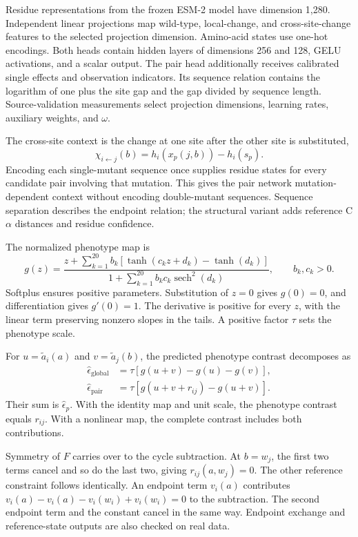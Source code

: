 \documentclass{llncs}
\begin{document}
Residue representations from the frozen ESM-2 model have dimension 1,280. Independent linear projections map wild-type, local-change, and cross-site-change features to the selected projection dimension. Amino-acid states use one-hot encodings. Both heads contain hidden layers of dimensions 256 and 128, GELU activations, and a scalar output. The pair head additionally receives calibrated single effects and observation indicators. Its sequence relation contains the logarithm of one plus the site gap and the gap divided by sequence length. Source-validation measurements select projection dimensions, learning rates, auxiliary weights, and $\omega$.

The cross-site context is the change at one site after the other site is substituted,
\begin{equation}
\chi_{i\leftarrow j}(b)=h_i(x_p(j,b))-h_i(s_p).
\end{equation}
Encoding each single-mutant sequence once supplies residue states for every candidate pair involving that mutation. This gives the pair network mutation-dependent context without encoding double-mutant sequences. Sequence separation describes the endpoint relation; the structural variant adds reference C$\alpha$ distances and residue confidence.

The normalized phenotype map is
\begin{equation}
g(z)=\frac{z+\sum_{k=1}^{20}b_k[\tanh(c_kz+d_k)-\tanh(d_k)]}
{1+\sum_{k=1}^{20}b_kc_k\operatorname{sech}^2(d_k)},\qquad b_k,c_k>0.
\end{equation}
Softplus ensures positive parameters. Substitution of $z=0$ gives $g(0)=0$, and differentiation gives $g'(0)=1$. The derivative is positive for every $z$, with the linear term preserving nonzero slopes in the tails. A positive factor $\tau$ sets the phenotype scale.

For $u=\widetilde a_i(a)$ and $v=\widetilde a_j(b)$, the predicted phenotype contrast decomposes as
\begin{align}
\widehat\epsilon_{\mathrm{global}}&=\tau[g(u+v)-g(u)-g(v)],\\
\widehat\epsilon_{\mathrm{pair}}&=\tau[g(u+v+r_{ij})-g(u+v)].
\end{align}
Their sum is $\widehat\epsilon_p$. With the identity map and unit scale, the phenotype contrast equals $r_{ij}$. With a nonlinear map, the complete contrast includes both contributions.

Symmetry of $F$ carries over to the cycle subtraction. At $b=w_j$, the first two terms cancel and so do the last two, giving $r_{ij}(a,w_j)=0$. The other reference constraint follows identically. An endpoint term $v_i(a)$ contributes $v_i(a)-v_i(a)-v_i(w_i)+v_i(w_i)=0$ to the subtraction. The second endpoint term and the constant cancel in the same way. Endpoint exchange and reference-state outputs are also checked on real data.
\end{document}
